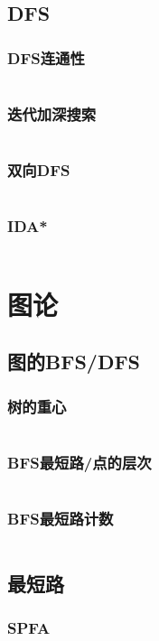 \documentclass[a4paper,12pt]{article}
\begin{document}
\subsection{DFS}
\subsubsection{DFS连通性}
\inputminted[breaklines, linenos]{c++}{search/dfs/link.cc}
\subsubsection{迭代加深搜索}
\inputminted[breaklines, linenos]{c++}{search/dfs/diedai.cc}
\subsubsection{双向DFS}
\inputminted[breaklines, linenos]{c++}{search/dfs/2side.cc}
\subsubsection{IDA*}
\inputminted[breaklines, linenos]{c++}{search/dfs/ida.cc}


\newpage
\section{图论} %
\subsection{图的BFS/DFS}  %
\subsubsection{树的重心}
\inputminted[breaklines, linenos]{c++}{graph/bdfs/grav.cc}
\subsubsection{BFS最短路/点的层次}
\inputminted[breaklines, linenos]{c++}{graph/bdfs/cenci.cc}
\subsubsection{BFS最短路计数}
\inputminted[breaklines, linenos]{c++}{graph/bdfs/sum.cc}
\subsection{最短路} %
\subsubsection{SPFA}
\inputminted[breaklines, linenos]{c++}{graph/shortest_path/spfa.cc}
\end{document}
